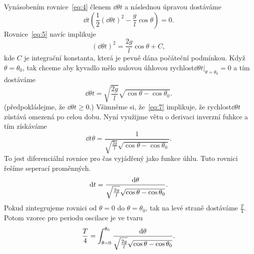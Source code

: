 \documentclass[reqno, a4paper]{amsart}
\begin{document}
		
		Vynásobením rovnice~\eqref{eq:4} členem $\dd{\theta}{t}$ a následnou úpravou dostáváme
		\begin{equation}
			\label{eq:5}
			\dd{}{t}
			\left(
			\frac{1}{2}
			\left(
			\dd{\theta}{t}
			\right)^2
			-
			\frac{g}{l}
			\cos \theta
			\right)
			=
			0
			.
		\end{equation}
		Rovnice~\eqref{eq:5} navíc implikuje
		\begin{equation}
			\label{eq:6}
			\left(
			\dd{\theta}{t}
			\right)^2
			=
			\frac{2g}{l}
			\cos \theta
			+
			C
			,
		\end{equation}
		kde $C$ je integrační konstanta, která je pevně dána počáteční podmínkou. Když $\theta = \theta_{0}$, tak chceme aby kyvadlo mělo nulovou úhlovou rychlost$\left. \dd{\theta}{t} \right|_{\theta = \theta_{0}}= 0$ a tím dostáváme
		\begin{equation}
			\label{eq:7}
			\dd{\theta}{t}
			=
			\sqrt{
				\frac{2g}{l}
			}
			\sqrt{\cos \theta - \cos \theta_{0}}.
		\end{equation}
		(předpokládejme, že $\dd{\theta}{t} \geq 0$.) Všimněme si, že~\eqref{eq:7} implikuje, že rychlost$\dd{\theta}{t}$ zůstává omezená po celou dobu. Nyní využijme větu o derivaci inverzní fuhkce a tím získáváme
		\begin{equation}
			\label{eq:8}
			\dd{t}{\theta}
			=
			\frac{1}
			{
				\sqrt{
					\frac{2g}{l}
				}
				\sqrt{\cos \theta - \cos \theta_{0}}
			}
			.
		\end{equation}
		To jest diferenciální rovnice pro čas vyjádřený jako funkce úhlu. Tuto rovnici řešíme seperací proměnných.
		\begin{equation}
			\label{eq:9}
			\mathrm{d} t  
			=
			\frac{\mathrm{d} \theta}
			{
				\sqrt{
					\frac{2g}{l}
				}
				\sqrt{\cos \theta - \cos \theta_{0}}
			}
			.
		\end{equation}
		Pokud zintegrujeme rovnici od $\theta=0$ do $\theta=\theta_{0}$, tak na levé straně dostáváme $\frac{T}{4}$. Potom vzorec pro periodu oscilace je ve tvaru
		\begin{equation}
			\label{eq:10}
			\frac{T}{4}
			=
			\int_{\theta=0}^{\theta_{0}}
			\frac{\mathrm{d} \theta}
			{
				\sqrt{
					\frac{2g}{l}
				}
				\sqrt{\cos \theta - \cos \theta_{0}}
			}
			.
		\end{equation}
		
\end{document}
